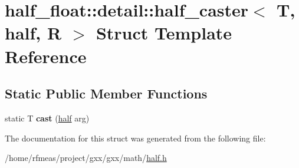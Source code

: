 \hypertarget{structhalf__float_1_1detail_1_1half__caster_3_01T_00_01half_00_01R_01_4}{}\section{half\+\_\+float\+:\+:detail\+:\+:half\+\_\+caster$<$ T, half, R $>$ Struct Template Reference}
\label{structhalf__float_1_1detail_1_1half__caster_3_01T_00_01half_00_01R_01_4}
\subsection*{Static Public Member Functions}
\begin{DoxyCompactItemize}
\item 
static T {\bfseries cast} (\hyperlink{classhalf__float_1_1half}{half} arg)\hypertarget{structhalf__float_1_1detail_1_1half__caster_3_01T_00_01half_00_01R_01_4_abab2f9d3906f11fd4a24493c0121b14a}{}\label{structhalf__float_1_1detail_1_1half__caster_3_01T_00_01half_00_01R_01_4_abab2f9d3906f11fd4a24493c0121b14a}

\end{DoxyCompactItemize}


The documentation for this struct was generated from the following file\+:\begin{DoxyCompactItemize}
\item 
/home/rfmeas/project/gxx/gxx/math/\hyperlink{half_8h}{half.\+h}\end{DoxyCompactItemize}
